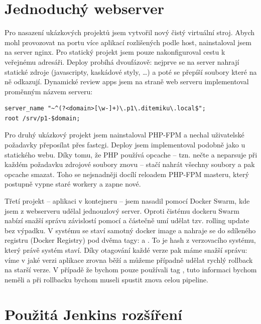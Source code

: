 \section{Jednoduchý webserver}
    Pro nasazení ukázkových projektů jsem vytvořil nový čistý virtuální stroj. Abych mohl provozovat na \HTTP portu více aplikací rozlišených podle host, nainstaloval jsem na server nginx. Pro statický projekt jsem pouze nakonfiguroval cestu k veřejnému adresáři. Deploy probíhá dvoufázově: nejprve se na server nahrají statické zdroje (javascripty, kaskádové styly, \ldots) a poté se přepíší  soubory které na ně odkazují. Dynamické review apps jsem na straně web serveru implementoval proměnným názvem serveru:

        \begin{verbatim}
server_name "~^(?<domain>[\w-]+)\.p1\.ditemiku\.local$";
root /srv/p1-$domain;
        \end{verbatim}

    Pro druhý ukázkový projekt jsem nainstaloval PHP-FPM a nechal uživatelské požadavky přeposílat přes fastcgi. Deploy jsem implementoval podobně jako u statického webu. Díky tomu, že PHP používá opcache -- tzn. nečte a neparsuje při každém požadavku zdrojové soubory znovu -- stačí nahrát všechny soubory a pak opcache smazat. Toho se nejsnadněji docílí reloadem PHP-FPM masteru, který postupně vypne staré workery a zapne nové.

    Třetí projekt -- aplikaci v kontejneru -- jsem nasadil pomocí Docker Swarm, kde jsem z webserveru udělal jednouzlový server. Oproti čistému dockeru Swarm nabízí snažší správu závislostí pomocí  a částečně umí udělat tzv. rolling update bez výpadku. V \CI systému se staví samotný docker image a nahraje se do sdíleného registru (Docker Registry) pod dvěma tagy:  a . To je hash z verzovacího systému, který právě \CI systém staví. Díky otagování každé verze pak máme snažší správu: víme v jaké verzi aplikace zrovna běží a můžeme případně udělat rychlý rollback na starší verze. V případě že bychom pouze používali tag , tuto informaci bychom neměli a při rollbacku bychom museli spustit znova celou \CI pipeline.

\newpage
\section{Použitá Jenkins rozšíření}
\label{ch:jenkins-plugins}

